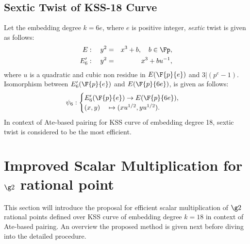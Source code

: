 \subsection{Sextic Twist of KSS-18 Curve}
Let the embedding degree $k = 6e$, where $e$ is positive integer, \textit{sextic} twist is given as follows:
\begin{eqnarray}
E:  \quad y^2 & = & x^3+b, \quad b \in \Fp, \\
E'_6: \quad y^2 & =  & x^3+bu^{-1},
\end{eqnarray}  
where $u$ is a quadratic and cubic non residue in $E(\F{p}{e})$ and $3|(p^e-1)$.  Isomorphism between $E'_6(\F{p}{e})$ and $E(\F{p}{6e})$, is given as follows:
\begin{eqnarray}
\psi_6 : \begin{cases}
E'_6(\F{p}{e}) \rightarrow E(\F{p}{6e}),\\
(x,y) \quad \mapsto (xu^{1/2},yu^{1/2}).
\end{cases}
\end{eqnarray}
In context of Ate-based pairing for KSS curve of embedding degree 18, sextic twist is considered to be the most efficient.

\section{Improved Scalar Multiplication for \texorpdfstring{$\g2$}{G2} rational point}
This section will introduce the proposal for efficient scalar multiplication of $\g2$ rational points defined over KSS curve of embedding degree $k=18$ in context of Ate-based pairing. 
An overview the proposed method is given next before diving into the detailed procedure.
